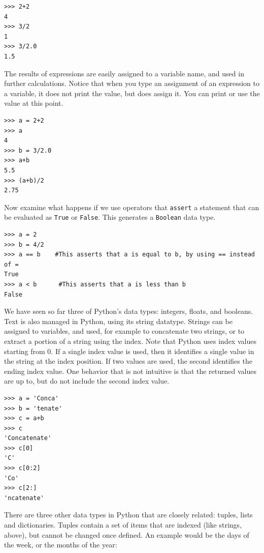 \begin{lstlisting}
>>> 2+2
4
>>> 3/2
1
>>> 3/2.0
1.5
\end{lstlisting}

The results of expressions are easily assigned to a variable name, and used in further calculations.  Notice that when you type an assignment of an expression to a variable, it does not print the value, but does assign it.  You can print or use the value at this point.  \\

\begin{lstlisting}
>>> a = 2+2
>>> a
4
>>> b = 3/2.0
>>> a+b
5.5
>>> (a+b)/2
2.75
\end{lstlisting}

Now examine what happens if we use operators that \verb#assert# a statement that can be evaluated as \verb#True# or \verb#False#.  This generates a \verb#Boolean# data type.

\begin{lstlisting}
>>> a = 2
>>> b = 4/2
>>> a == b    #This asserts that a is equal to b, by using == instead of =
True
>>> a < b      #This asserts that a is less than b
False
\end{lstlisting}

We have seen so far three of Python's data types: integers, floats, and booleans.  Text is also managed in Python, using its string datatype.  Strings can be assigned to variables, and used, for example to concatenate two strings, or to extract a portion of a string using the index.  Note that Python uses index values starting from 0.  If a single index value is used, then it identifies a single value in the string at the index position.  If two values are used, the second identifies the ending index value.  One behavior that is not intuitive is that the returned values are up to, but do not include the second index value.\\

\begin{lstlisting}
>>> a = 'Conca'
>>> b = 'tenate'
>>> c = a+b
>>> c
'Concatenate'
>>> c[0]
'C'
>>> c[0:2]
'Co'
>>> c[2:]
'ncatenate'
\end{lstlisting}

There are three other data types in Python that are closely related: tuples, lists and dictionaries.  Tuples contain a set of items that are indexed (like strings, above), but cannot be changed once defined.  An example would be the days of the week, or the months of the year:

